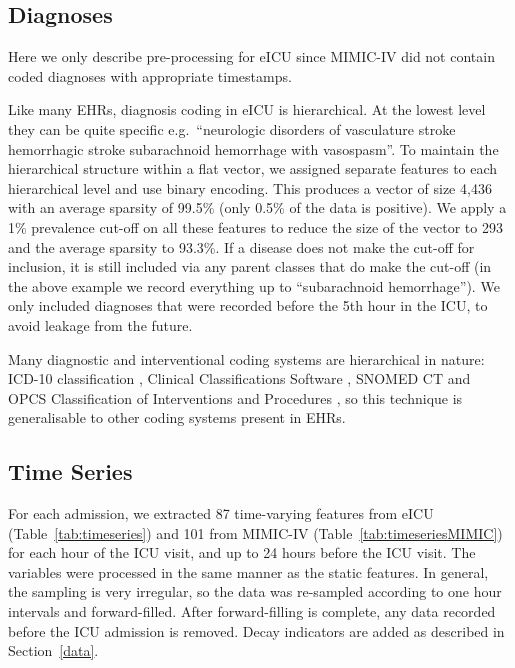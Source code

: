 \documentclass[sigconf]{acmart}
\begin{document}
\subsection{Diagnoses}
Here we only describe pre-processing for eICU since MIMIC-IV did not contain coded diagnoses with appropriate timestamps.

Like many EHRs, diagnosis coding in eICU is hierarchical. At the lowest level they can be quite specific e.g.\ ``neurologic  disorders of vasculature  stroke  hemorrhagic stroke  subarachnoid hemorrhage  with vasospasm''. To maintain the hierarchical structure within a flat vector, we assigned separate features to each hierarchical level and use binary encoding. This produces a vector of size 4,436 with an average sparsity of 99.5\% (only 0.5\% of the data is positive). We apply a 1\% prevalence cut-off on all these features to reduce the size of the vector to 293 and the average sparsity to 93.3\%. If a disease does not make the cut-off for inclusion, it is still included via any parent classes that do make the cut-off (in the above example we record everything up to ``subarachnoid hemorrhage''). We only included diagnoses that were recorded before the 5th hour in the ICU, to avoid leakage from the future.

Many diagnostic and interventional coding systems are hierarchical in nature: ICD-10 classification \citep{icd10}, Clinical Classifications Software \citep{ccs}, SNOMED CT \citep{10.1016/j.cmpb.2011.01.002} and OPCS Classification of Interventions and Procedures \citep{Digital2019}, so this technique is generalisable to other coding systems present in EHRs. 

\subsection{Time Series}
\label{timeseriespreproc}
For each admission, we extracted 87 time-varying features from eICU (Table~\ref{tab:timeseries}) and 101 from MIMIC-IV (Table~\ref{tab:timeseriesMIMIC}) for each hour of the ICU visit, and up to 24 hours before the ICU visit. The variables were processed in the same manner as the static features. In general, the sampling is very irregular, so the data was re-sampled according to one hour intervals and forward-filled. After forward-filling is complete, any data recorded before the ICU admission is removed. Decay indicators are added as described in Section~\ref{data}.
\end{document}
